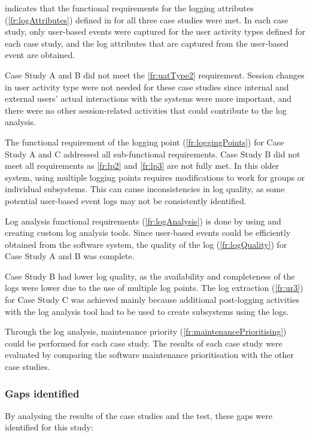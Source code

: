  indicates that the functional requirements for the logging attributes (\ref{fr:logAttributes}) defined in  for all three case studies were met. In each case study, only user-based events were captured for the user activity types defined for each case study, and the log attributes that are captured from the user-based event are obtained. \par Case Study A and B did not meet the \ref{fr:uatType2} requirement. Session changes in user activity type were not needed for these case studies since internal and external users' actual interactions with the systems were more important, and there were no other session-related activities that could contribute to the log analysis. \par The functional requirement of the logging point (\ref{fr:loggingPoints}) for Case Study A and C addressed all sub-functional requirements. Case Study B did not meet all requirements as \ref{fr:lp2} and \ref{fr:lp3} are not fully met. In this older system, using multiple logging points requires modifications to work for groups or individual subsystems. This can cause inconsistencies in log quality, as some potential user-based event logs may not be consistently identified. \par Log analysis functional requirements (\ref{fr:logAnalysis}) is done by using and creating custom log analysis tools. Since user-based events could be efficiently obtained from the software system, the quality of the log (\ref{fr:logQuality}) for Case Study A and B was complete. \par Case Study B had lower log quality, as the availability and completeness of the logs were lower due to the use of multiple log points. The log extraction (\ref{fr:ur3}) for Case Study C was achieved mainly because additional post-logging activities with the log analysis tool had to be used to create subsystems using the logs.\par Through the log analysis, maintenance priority (\ref{fr:maintenancePrioritising}) could be performed for each case study. The results of each case study were evaluated by comparing the software maintenance prioritisation with the other case studies.

\subsubsection{Gaps identified}
By analysing the results of the case studies and the test, these gaps were identified for this study:

